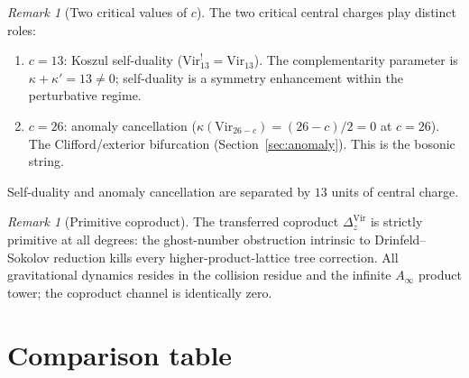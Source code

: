 \documentclass[11pt,reqno]{amsart}
\theoremstyle{definition}
\theoremstyle{remark}
\newtheorem{remark}[theorem]{Remark}
\newcommand{\Ainf}{A_{\infty}}
\newcommand{\Vir}{\mathrm{Vir}}
\numberwithin{equation}{section}
\begin{document}
\begin{remark}[Two critical values of $c$]\label{rem:vir-critical}
The two critical central charges play distinct roles:
\begin{enumerate}[nosep,label=(\roman*)]
\item $c = 13$: Koszul self-duality
  ($\Vir_{13}^! = \Vir_{13}$). The complementarity parameter is
  $\kappa + \kappa' = 13 \neq 0$; self-duality is a symmetry
  enhancement within the perturbative regime.
\item $c = 26$: anomaly cancellation
  ($\kappa(\Vir_{26-c}) = (26-c)/2 = 0$ at $c = 26$). The
  Clifford/exterior bifurcation
  (Section~\ref{sec:anomaly}). This is the bosonic string.
\end{enumerate}
Self-duality and anomaly cancellation are separated by $13$
units of central charge.
\end{remark}

\begin{remark}[Primitive coproduct]\label{rem:vir-coproduct}
The transferred coproduct $\Delta_z^{\Vir}$ is strictly primitive
at all degrees: the ghost-number obstruction intrinsic to
Drinfeld--Sokolov reduction kills every higher-product-lattice
tree correction. All gravitational dynamics resides in the
collision residue and the infinite $\Ainf$ product tower; the
coproduct channel is identically zero.
\end{remark}


\section{Comparison table}\label{sec:comparison}
\end{document}
